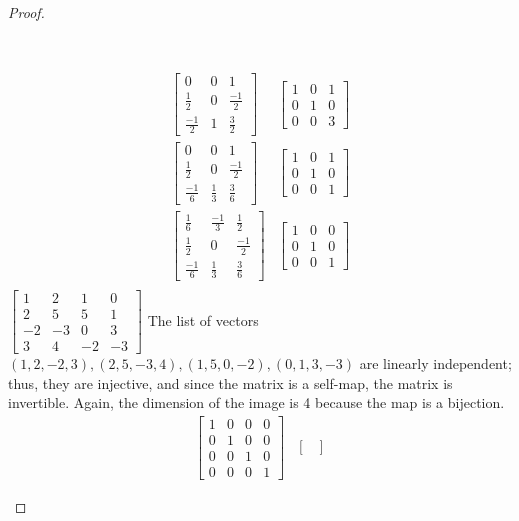 \documentclass[11pt]{article}
\newenvironment{myproof}
{\begin{proof} \begin{adjustwidth}{3em}{0pt}$ $\par\nobreak\ignorespaces}
{\end{adjustwidth} \end{proof}}
\begin{document}
\begin{flushleft}
\begin{myproof}
\begin{align*}
\begin{bmatrix}
0 & 0 & 1 \\
\frac{1}{2} & 0 & \frac{-1}{2} \\
\frac{-1}{2} & 1 & \frac{3}{2}
\end{bmatrix}
&\begin{bmatrix}
1 & 0 & 1 \\
0 & 1 & 0 \\
0 & 0 & 3
\end{bmatrix} \\
\begin{bmatrix}
0 & 0 & 1 \\
\frac{1}{2} & 0 & \frac{-1}{2} \\
\frac{-1}{6} & \frac{1}{3} & \frac{3}{6}
\end{bmatrix}
&\begin{bmatrix}
1 & 0 & 1 \\
0 & 1 & 0 \\
0 & 0 & 1
\end{bmatrix} \\
\begin{bmatrix}
\frac{1}{6} & \frac{-1}{3} & \frac{1}{2} \\
\frac{1}{2} & 0 & \frac{-1}{2} \\
\frac{-1}{6} & \frac{1}{3} & \frac{3}{6}
\end{bmatrix}
&\begin{bmatrix}
1 & 0 & 0 \\
0 & 1 & 0 \\
0 & 0 & 1
\end{bmatrix} \\
\end{align*}
\bigskip
$\begin{bmatrix}
1 & 2 & 1 & 0 \\
2 & 5 & 5 & 1 \\
-2 & -3 & 0 & 3 \\
3 & 4 & -2 & -3
\end{bmatrix}$ The list of vectors $(1,2,-2,3),(2,5,-3,4),(1,5,0,-2),(0,1,3,-3)$ are linearly independent; thus, they are injective, and since the matrix is a self-map, the matrix is invertible. Again, the dimension of the image is 4 because the map is a bijection.
\begin{align*}
\begin{bmatrix}
1 & 0 & 0 & 0 \\
0 & 1 & 0 & 0 \\
0 & 0 & 1 & 0 \\
0 & 0 & 0 & 1
\end{bmatrix}
&\begin{bmatrix}

\end{bmatrix}
\end{align*}
\end{myproof}
\end{flushleft}
\end{document}
